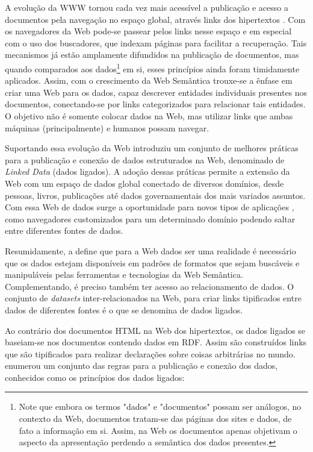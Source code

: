 A evolução da WWW tornou cada vez mais acessível a publicação e acesso a documentos pela navegação no espaço global, através links dos hipertextos \citep{Bizer2009}. Com os navegadores da Web pode-se passear pelos links nesse espaço e em especial com o uso dos buscadores, que indexam páginas para facilitar a recuperação. Tais mecanismos já estão amplamente difundidos na publicação de documentos, mas quando comparados aos dados\footnote{Note que embora os termos "dados" e "documentos" possam ser análogos, no contexto da Web, documentos tratam-se das páginas dos sites e dados, de fato a informação em si. Assim, na Web os documentos apenas objetivam o aspecto da apresentação perdendo a semântica dos dados presentes.} em si, esses princípios ainda foram timidamente aplicados. Assim, com o crescimento da Web Semântica trouxe-se a ênfase em criar uma Web para os dados, capaz descrever entidades individuais presentes nos documentos, conectando-se por links categorizados para relacionar tais entidades. O objetivo não é somente colocar dados na Web, mas utilizar links que ambas máquinas (principalmente) e humanos possam navegar.

Suportando essa evolução da Web \citep{LinkedData:2006} introduziu um conjunto de melhores práticas para a publicação e conexão de dados estruturados na Web, denominado de \textit{Linked Data} (dados ligados). A adoção dessas práticas permite a extensão da Web com um espaço de dados global conectado de diversos domínios, desde pessoas, livros, publicações até dados governamentais dos mais variados assuntos. Com essa Web de dados surge a oportunidade para novos tipos de aplicações \citep{Bizer2009}, como navegadores customizados para um determinado domínio podendo saltar entre diferentes fontes de dados.

Resumidamente, a \cite{LinkedDataW3C} define que para a Web dados ser uma realidade é necessário que os dados estejam disponíveis em padrões de formatos que sejam buscáveis e manipuláveis pelas ferramentas e tecnologias da Web Semântica. Complementando, é preciso também ter acesso ao relacionamento de dados. O conjunto de \textit{datasets} inter-relacionados na Web, para criar links tipificados entre dados de diferentes fontes é o que se denomina de dados ligados.

Ao contrário dos documentos \ac{HTML} na Web dos hipertextos, os dados ligados se baseiam-se nos documentos contendo dados em RDF. Assim são construídos links que são tipificados para realizar declarações sobre coisas arbitrárias no mundo. \cite{LinkedData:2006} enumerou um conjunto das regras para a publicação e conexão dos dados, conhecidos como os princípios dos dados ligados:

